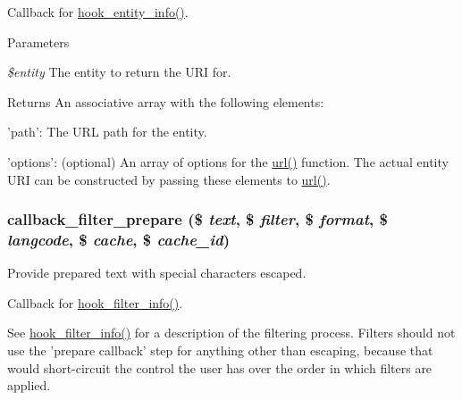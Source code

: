 Callback for \hyperlink{group__hooks_gaf02318e9d0e8cdbf6d187b271b9969a8}{hook\_\-entity\_\-info()}.


\begin{DoxyParams}{Parameters}
\item[{\em \$entity}]The entity to return the URI for.\end{DoxyParams}
\begin{DoxyReturn}{Returns}
An associative array with the following elements:
\begin{DoxyItemize}
\item 'path': The URL path for the entity.
\item 'options': (optional) An array of options for the \hyperlink{common_8inc_a43b2a0594431556db49df980801d8807}{url()} function. The actual entity URI can be constructed by passing these elements to \hyperlink{common_8inc_a43b2a0594431556db49df980801d8807}{url()}. 
\end{DoxyItemize}
\end{DoxyReturn}
\hypertarget{group__callbacks_ga28144a42933a1bd6c183e758583f1039}{
\subsubsection[{callback\_\-filter\_\-prepare}]{\setlength{\rightskip}{0pt plus 5cm}callback\_\-filter\_\-prepare (\$ {\em text}, \/  \$ {\em filter}, \/  \$ {\em format}, \/  \$ {\em langcode}, \/  \$ {\em cache}, \/  \$ {\em cache\_\-id})}}
\label{group__callbacks_ga28144a42933a1bd6c183e758583f1039}
Provide prepared text with special characters escaped.

Callback for \hyperlink{group__hooks_gaf2a2f2a46589420df896a0d42247f15a}{hook\_\-filter\_\-info()}.

See \hyperlink{group__hooks_gaf2a2f2a46589420df896a0d42247f15a}{hook\_\-filter\_\-info()} for a description of the filtering process. Filters should not use the 'prepare callback' step for anything other than escaping, because that would short-\/circuit the control the user has over the order in which filters are applied.


